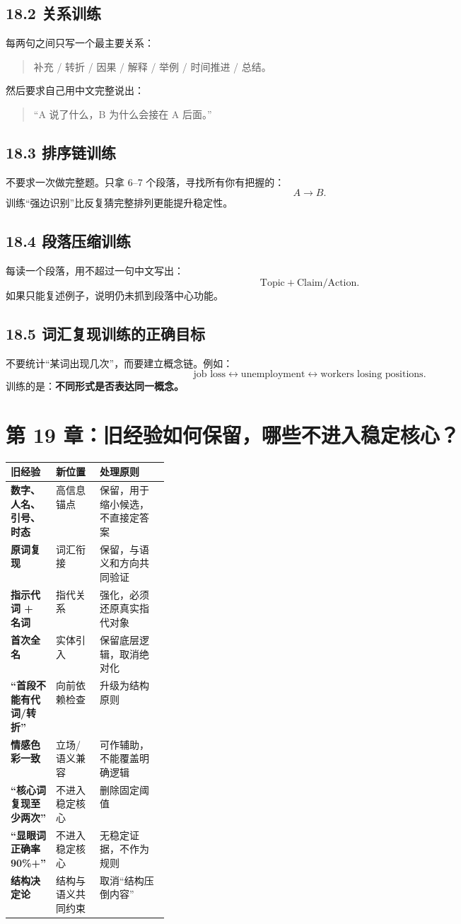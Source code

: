 \documentclass[11pt,a4paper]{ctexart}
\newcommand{\kw}[1]{\textbf{#1}}
\begin{document}
\subsection{18.2 关系训练}
每两句之间只写一个最主要关系：
\begin{quote}
补充 / 转折 / 因果 / 解释 / 举例 / 时间推进 / 总结。
\end{quote}
然后要求自己用中文完整说出：
\begin{quote}
“A 说了什么，B 为什么会接在 A 后面。”
\end{quote}

\subsection{18.3 排序链训练}
不要求一次做完整题。只拿 6--7 个段落，寻找所有你有把握的：
\[
A\rightarrow B.
\]
训练“强边识别”比反复猜完整排列更能提升稳定性。

\subsection{18.4 段落压缩训练}
每读一个段落，用不超过一句中文写出：
\[
\text{Topic}+\text{Claim/Action}.
\]
如果只能复述例子，说明仍未抓到段落中心功能。

\subsection{18.5 词汇复现训练的正确目标}
不要统计“某词出现几次”，而要建立概念链。例如：
\[
\text{job loss}
\leftrightarrow
\text{unemployment}
\leftrightarrow
\text{workers losing positions}.
\]
训练的是：\kw{不同形式是否表达同一概念。}

\section{第 19 章：旧经验如何保留，哪些不进入稳定核心？}

\begin{center}
\small
\begin{tabularx}{\linewidth}{>{\bfseries}p{0.26\linewidth} X X}
\toprule
旧经验 & 新位置 & 处理原则 \\
\midrule
数字、人名、引号、时态 & 高信息锚点 & 保留，用于缩小候选，不直接定答案 \\
原词复现 & 词汇衔接 & 保留，与语义和方向共同验证 \\
指示代词 + 名词 & 指代关系 & 强化，必须还原真实指代对象 \\
首次全名 & 实体引入 & 保留底层逻辑，取消绝对化 \\
“首段不能有代词/转折” & 向前依赖检查 & 升级为结构原则 \\
情感色彩一致 & 立场/语义兼容 & 可作辅助，不能覆盖明确逻辑 \\
“核心词复现至少两次” & 不进入稳定核心 & 删除固定阈值 \\
“显眼词正确率 90\%+” & 不进入稳定核心 & 无稳定证据，不作为规则 \\
结构决定论 & 结构与语义共同约束 & 取消“结构压倒内容” \\
\bottomrule
\end{tabularx}
\end{center}
\end{document}
